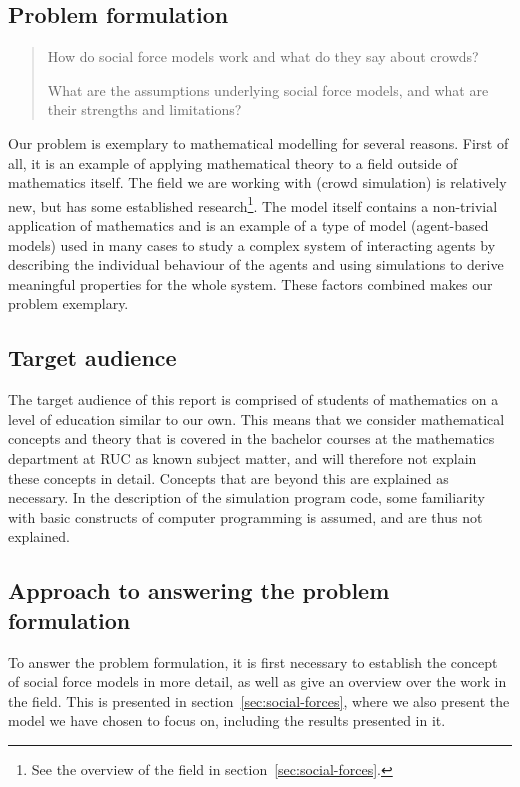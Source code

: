 \subsection{Problem formulation}
\begin{quote}
    How do social force models work and what do they say about crowds?

    What are the assumptions underlying social force models, and what are 
    their strengths and limitations?
\end{quote}

Our problem is exemplary to mathematical modelling for several reasons. First 
of all, it is an example of applying mathematical theory to a field outside of 
mathematics itself. The field we are working with (crowd simulation) is 
relatively new, but has some established research\footnote{See the overview of 
the field in section~\ref{sec:social-forces}.}. The model itself contains a 
non-trivial application of mathematics and is an example of a type of model 
(agent-based models) used in many cases to study a complex system of 
interacting agents by describing the individual behaviour of the agents and 
using simulations to derive meaningful properties for the whole system. These 
factors combined makes our problem exemplary.

\subsection{Target audience}
The target audience of this report is comprised of students of mathematics on 
a level of education similar to our own. This means that we consider 
mathematical concepts and theory that is covered in the bachelor courses at 
the mathematics department at RUC as known subject matter, and will therefore 
not explain these concepts in detail. Concepts that are beyond this are 
explained as necessary. In the description of the simulation program code, 
some familiarity with basic constructs of computer programming is assumed, and 
are thus not explained.

\subsection{Approach to answering the problem formulation}
To answer the problem formulation, it is first necessary to establish the 
concept of social force models in more detail, as well as give an overview 
over the work in the field. This is presented in 
section~\ref{sec:social-forces}, where we also present the model we have chosen 
to focus on, including the results presented in it.

